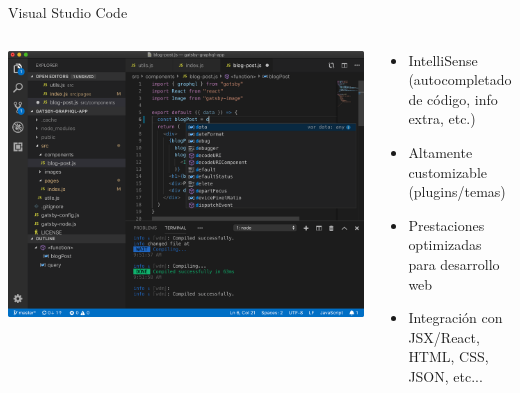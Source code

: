 \documentclass{beamer}
\begin{document}
\begin{frame}{Visual Studio Code}
	\begin{columns}
  		\begin{column}{.5\textwidth}
			\includegraphics[scale=.15]{img/vscode.png}
		\end{column}
		\begin{column}{.5\textwidth}
				
			\begin{itemize}
				\item IntelliSense (autocompletado de código, info extra, etc.)
				\item Altamente customizable (plugins/temas)
				\item Prestaciones optimizadas para desarrollo web
				\item Integración con JSX/React, HTML, CSS, JSON, etc...
			\end{itemize}
		\end{column}
	\end{columns}
\end{frame}
\end{document}
